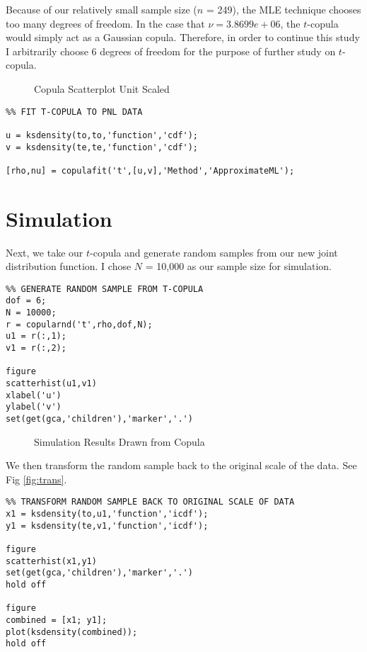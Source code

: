 \documentclass[titlepage]{article}
\begin{document}
Because of our relatively small sample size ($n$ = 249), the MLE technique chooses too many degrees of freedom. In the case that $\nu = 3.8699e+06$, the $t$-copula would simply act as a Gaussian copula. Therefore, in order to continue this study I arbitrarily choose 6 degrees of freedom for the purpose of further study on $t$-copula.

\begin{figure}
	\centering
		\caption{Copula Scatterplot Unit Scaled}
		\label{fig:cop_scaled}		
\end{figure}

\begin{verbatim}
%% FIT T-COPULA TO PNL DATA

u = ksdensity(to,to,'function','cdf');
v = ksdensity(te,te,'function','cdf');

[rho,nu] = copulafit('t',[u,v],'Method','ApproximateML');
\end{verbatim}

\section{Simulation}
Next, we take our $t$-copula and generate random samples from our new joint distribution function. I chose $N$ = 10,000 as our sample size for simulation.

\begin{verbatim}
%% GENERATE RANDOM SAMPLE FROM T-COPULA
dof = 6;
N = 10000;
r = copularnd('t',rho,dof,N);
u1 = r(:,1);
v1 = r(:,2);

figure
scatterhist(u1,v1)
xlabel('u')
ylabel('v')
set(get(gca,'children'),'marker','.')
\end{verbatim}

\begin{figure}
	\centering
	\caption{Simulation Results Drawn from Copula}
\end{figure}


We then transform the random sample back to the original scale of the data. See Fig \ref{fig:trans}.

\begin{verbatim}
%% TRANSFORM RANDOM SAMPLE BACK TO ORIGINAL SCALE OF DATA
x1 = ksdensity(to,u1,'function','icdf');
y1 = ksdensity(te,v1,'function','icdf');

figure
scatterhist(x1,y1)
set(get(gca,'children'),'marker','.')
hold off

figure
combined = [x1; y1];
plot(ksdensity(combined));
hold off
\end{verbatim}
\end{document}
